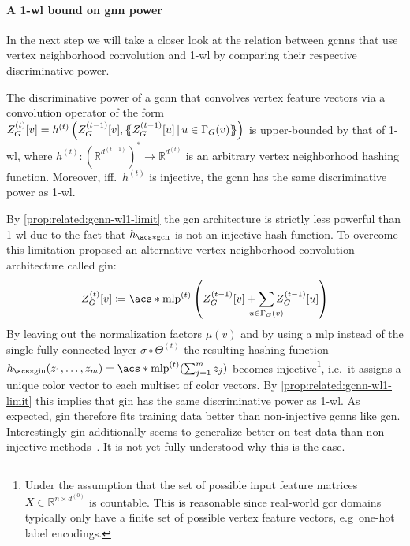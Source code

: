 \paragraph{A 1-\acs{wl} bound on \ac{gnn} power}
In the next step we will take a closer look at the relation between \acp{gcnn} that use vertex neighborhood convolution and 1-\acs{wl} by comparing their respective discriminative power.
\begin{prop}\label{prop:related:gcnn-wl1-limit}
	The discriminative power of a \ac{gcnn} that convolves vertex feature vectors via a convolution operator of the form $Z_G^{(t)}[v] = h^{(t)}\left(Z_G^{(t-1)}[v], \ldblbrace Z_G^{(t-1)}[u]\, |\, u \in \Gamma_G(v) \rdblbrace\right)$ is upper-bounded by that of 1-\acs{wl}, where $h^{(t)}: {\left(\mathbb{R}^{d^{(t-1)}}\right)}^{*} \to \mathbb{R}^{d^{(t)}}$ is an arbitrary vertex neighborhood hashing function.
	Moreover, iff.\ $h^{(t)}$ is injective, the \ac{gcnn} has the same discriminative power as 1-\acs{wl}.
\end{prop}
By \cref{prop:related:gcnn-wl1-limit} the \ac{gcn} architecture is strictly less powerful than 1-\acs{wl} due to the fact that $h_{\mathrm{\acs*{gcn}}}$ is not an injective hash function.
To overcome this limitation \citet{Xu2018} proposed an alternative vertex neighborhood convolution architecture called \ac{gin}:
\begin{align}
	Z_G^{(t)}[v] \coloneqq \mathrm{\acs*{mlp}}^{(t)}\left( Z_G^{(t-1)}[v] + \smashoperator[lr]{\sum_{u \in \Gamma_G(v)}} Z_G^{(t-1)}[u] \right) \label{eq:related:gin-layer}
\end{align}
By leaving out the normalization factors $\mu(v)$ and by using a \ac{mlp} instead of the single fully-connected layer $\sigma \circ \Theta^{(t)}$ the resulting hashing function $h_{\mathrm{\acs*{gin}}}(z_1, \dots, z_m) = \mathrm{\acs*{mlp}}^{(t)}(\sum_{j=1}^{m} z_j)$ becomes injective\footnote{
	Under the assumption that the set of possible input feature matrices $X \in \mathbb{R}^{n \times d^{(0)}}$ is countable.
	This is reasonable since real-world \ac{gcr} domains typically only have a finite set of possible vertex feature vectors, e.g\ one-hot label encodings.
}, i.e.\ it assigns a unique color vector to each multiset of color vectors.
By \cref{prop:related:gcnn-wl1-limit} this implies that \ac{gin} has the same discriminative power as 1-\ac{wl}.
As expected, \ac{gin} therefore fits training data better than non-injective \acp{gcnn} like \ac{gcn}.
Interestingly \ac{gin} additionally seems to generalize better on test data than non-injective methods~\cite{Xu2018}\cite{Errica2020}.
It is not yet fully understood why this is the case.

